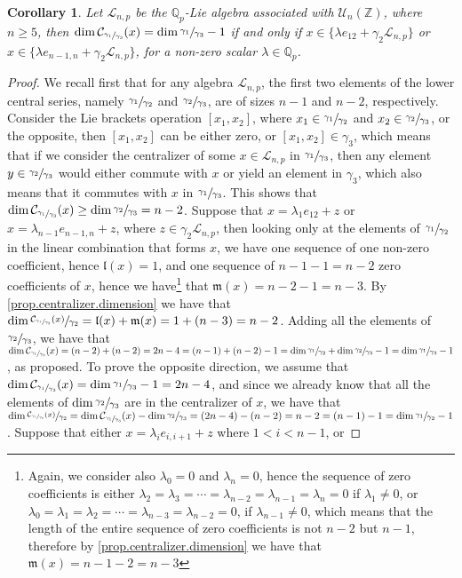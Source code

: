 \documentclass[12pt]{article}
\newtheorem{corollary}[theorem]{Corollary}
\begin{document}
\begin{corollary}
\label{prop.n.geq.5.centralizer.codimension}
Let $\mathcal{L}_{n,p}$ be the $\mathbb{Q}_p$-Lie algebra associated with $\mathcal{U}_n(\mathbb{Z})$, where $n\geq 5$, then $\dim\mathcal{C}_{\sfrac{\gamma_1}{\gamma_3}}(x)=\dim\sfrac{\gamma_1}{\gamma_3}-1$ if and only if $x\in\{\lambda e_{12}+\gamma_2\mathcal{L}_{n,p}\}$ or $x\in\{\lambda e_{n-1,n}+\gamma_2\mathcal{L}_{n,p}\}$, for a non-zero scalar $\lambda\in\mathbb{Q}_p$.
\end{corollary}
\begin{proof}
We recall first that for any algebra $\mathcal{L}_{n,p}$, the first two elements of the lower central series, namely $\sfrac{\gamma_1}{\gamma_2}$ and $\sfrac{\gamma_2}{\gamma_3}$, are of sizes $n-1$ and $n-2$, respectively. Consider the Lie brackets operation $[x_1,x_2]$, where $x_1\in\sfrac{\gamma_1}{\gamma_2}$ and $x_2\in\sfrac{\gamma_2}{\gamma_3}$, or the opposite, then $[x_1,x_2]$ can be either zero, or $[x_1,x_2]\in\gamma_3$, which means that if we consider the centralizer of some $x\in\mathcal{L}_{n,p}$ in $\sfrac{\gamma_1}{\gamma_3}$, then any element $y\in\sfrac{\gamma_2}{\gamma_3}$ would either commute with $x$ or yield an element in $\gamma_3$, which also means that it commutes with $x$ in $\sfrac{\gamma_1}{\gamma_3}$. This shows that $\dim\mathcal{C}_{\sfrac{\gamma_1}{\gamma_3}}(x)\geq\dim\sfrac{\gamma_2}{\gamma_3}=n-2$. Suppose that $x=\lambda_1 e_{12}+z$ or $x=\lambda_{n-1}e_{n-1,n}+z$, where $z\in\gamma_2\mathcal{L}_{n,p}$, then looking only at the elements of $\sfrac{\gamma_1}{\gamma_2}$ in the linear combination that forms $x$, we have one sequence of one non-zero coefficient, hence $\mathfrak{l}(x)=1$, and one sequence of $n-1-1=n-2$ zero coefficients of $x$, hence we have\footnote{Again, we consider also $\lambda_0=0$ and $\lambda_n=0$, hence the sequence of zero coefficients is either $\lambda_2=\lambda_3=\cdots=\lambda_{n-2}=\lambda_{n-1}=\lambda_n=0$ if $\lambda_1\neq 0$, or $\lambda_0=\lambda_1=\lambda_2=\cdots=\lambda_{n-3}=\lambda_{n-2}=0$, if $\lambda_{n-1}\neq 0$, which means that the length of the entire sequence of zero coefficients is not $n-2$ but $n-1$, therefore by \ref{prop.centralizer.dimension} we have that $\mathfrak{m}(x)=n-1-2=n-3$} that $\mathfrak{m}(x)=n-2-1=n-3$. By \ref{prop.centralizer.dimension} we have that $\dim\sfrac{\mathcal{C}_{\sfrac{\gamma_1}{\gamma_3}}(x)}{\gamma_2}=\mathfrak{l}(x)+\mathfrak{m}(x)=1+(n-3)=n-2$. Adding all the elements of $\sfrac{\gamma_2}{\gamma_3}$, we have that $\dim\mathcal{C}_{\sfrac{\gamma_1}{\gamma_3}}(x)=(n-2)+(n-2)=2n-4=(n-1)+(n-2)-1=\dim\sfrac{\gamma_1}{\gamma_2}+\dim\sfrac{\gamma_2}{\gamma_3}-1=\dim\sfrac{\gamma_1}{\gamma_3}-1$, as proposed. To prove the opposite direction, we assume that $\dim\mathcal{C}_{\sfrac{\gamma_1}{\gamma_3}}(x)=\dim\sfrac{\gamma_1}{\gamma_3}-1=2n-4$, and since we already know that all the elements of $\dim\sfrac{\gamma_2}{\gamma_3}$ are in the centralizer of $x$, we have that $\dim\sfrac{\mathcal{C}_{\sfrac{\gamma_1}{\gamma_3}}(x)}{\gamma_2}=\dim\mathcal{C}_{\sfrac{\gamma_1}{\gamma_3}}(x)-\dim\sfrac{\gamma_2}{\gamma_3}=(2n-4)-(n-2)=n-2=(n-1)-1=\dim\sfrac{\gamma_1}{\gamma_2}-1$. Suppose that either $x=\lambda_i e_{i,i+1}+z$ where $1<i<n-1$, or 
\end{proof}
\end{document}
